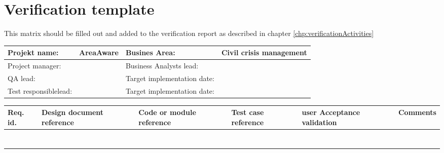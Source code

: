 
\begin{sidewaystable}
\chapter{Verification template}
This matrix should be filled out and added to the verification report as described in chapter \ref{chp:verificationActivities}
	\label{chp_appendixTemplate}
	\renewcommand\arraystretch{1.5}
	\begin{longtable}{| p{3.5cm}  | p{4.6cm} |  p{5cm}  | p{5cm} |}\hline
		Projekt name: 	& AreaAware & Busines Area:	& Civil crisis management \\ \hline
		Project manager:& & Business Analysts lead: 	& \\ \hline
		QA lead: 		& & Target implementation date:	& \\ \hline
		Test responsiblelead: 		& & Target implementation date:	& \\ \hline
	\end{longtable}
	\vspace{-9pt}
	\begin{longtable}{| p{1.5cm}  | p{3cm}  | p{4.2cm} |  p{1.5cm}  | p{4cm}  |  p{3cm}  |} \hline
		Req. id. & Design document reference & Code or module reference & Test case reference & user Acceptance validation  & Comments \\ \hline	
		&& && & \\ \hline
		&& && & \\ \hline
		&& && &\\ \hline
		&& && & \\ \hline
		&& && & \\ \hline
		&& && &  \\ \hline
		&& && &  \\ \hline
	\end{longtable}
	\renewcommand\arraystretch{1}
\end{sidewaystable}




